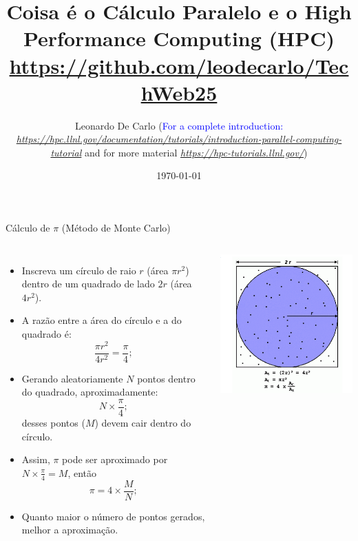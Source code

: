 \documentclass{beamer}
\title{Coisa é o Cálculo Paralelo e o High Performance Computing (HPC)\\
\textcolor{red}{\href{https://github.com/leodecarlo/TechWeb25}{https://github.com/leodecarlo/TechWeb25}}}
\author{Leonardo De Carlo
(\textcolor{blue}{For a complete introduction: \emph{ \href{https://hpc.llnl.gov/documentation/tutorials/introduction-parallel-computing-tutorial}{https://hpc.llnl.gov/documentation/tutorials/introduction-parallel-computing-tutorial}}} and for more material \textcolor{blue}{\href{https://hpc-tutorials.llnl.gov/}{\emph{https://hpc-tutorials.llnl.gov/}}})}
\institute{CopeLab: AI and Complexity, Universidade Lusófona}
\date{\today}
\begin{document}
	
	\begin{frame}
		\titlepage
	\end{frame}
	
	\begin{frame}{Cálculo de \(\pi\) (Método de Monte Carlo)}
		
		\begin{columns}[T]
			\scriptsize
			\column{0.6\textwidth}
			\begin{itemize}
				\item Inscreva um círculo de raio \(r\) (área \(\pi r^2\)) dentro de um quadrado de lado \(2r\) (área \(4r^2\)).
				\item A razão entre a área do círculo e a do quadrado é: 
				\[
				\frac{\pi r^2}{4r^2} = \frac{\pi}{4};
				\]
				\item Gerando aleatoriamente \(N\) pontos dentro do quadrado, aproximadamente:  
				\[
				N \times \frac{\pi}{4};
				\]
				desses pontos (\(M\)) devem cair dentro do círculo.
				\item Assim, \(\pi\) pode ser aproximado por $N \times \frac{\pi}{4} = M$, então
				\[
				 \pi = 4 \times \frac{M}{N};
				\]
				\item Quanto maior o número de pontos gerados, melhor a aproximação.
			\end{itemize}
			
			\column{0.4\textwidth}
			\includegraphics[scale=0.4]{circfig.png}
		\end{columns}
	\end{frame}
	
\end{document}
